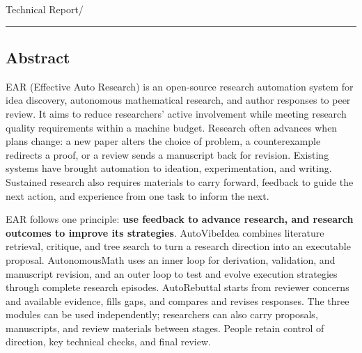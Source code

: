 \hfill{\sffamily\footnotesize\color{muted}Technical Report\quad /}\par
\vspace{1mm}\par
\vspace{4mm}\par
\vspace{4mm}\noindent\AuthorsCompact
\vspace{3mm}\noindent\textcolor{navy!35}{\rule{\textwidth}{.5pt}}\par
\vspace{1mm}\subsection*{Abstract}
EAR (Effective Auto Research) is an open-source research automation system for idea discovery, autonomous mathematical research, and author responses to peer review. It aims to reduce researchers' active involvement while meeting research quality requirements within a machine budget. Research often advances when plans change: a new paper alters the choice of problem, a counterexample redirects a proof, or a review sends a manuscript back for revision. Existing systems have brought automation to ideation, experimentation, and writing. Sustained research also requires materials to carry forward, feedback to guide the next action, and experience from one task to inform the next.

EAR follows one principle: \textbf{use feedback to advance research, and research outcomes to improve its strategies}. AutoVibeIdea combines literature retrieval, critique, and tree search to turn a research direction into an executable proposal. AutonomousMath uses an inner loop for derivation, validation, and manuscript revision, and an outer loop to test and evolve execution strategies through complete research episodes. AutoRebuttal starts from reviewer concerns and available evidence, fills gaps, and compares and revises responses. The three modules can be used independently; researchers can also carry proposals, manuscripts, and review materials between stages. People retain control of direction, key technical checks, and final review.

